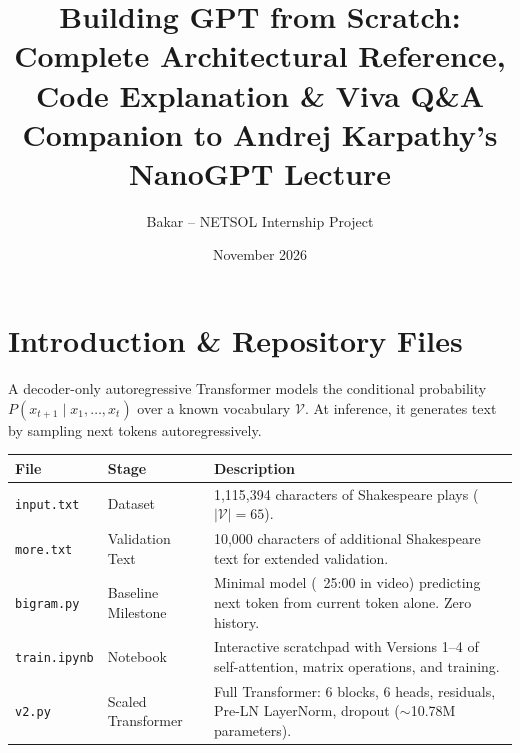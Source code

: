 \documentclass[10pt,a4paper]{article}
\title{\vspace{-1.2cm}\textbf{\Large Building GPT from Scratch: Complete Architectural Reference, Code Explanation \& Viva Q\&A}\\\normalsize Companion to Andrej Karpathy's NanoGPT Lecture\vspace{-0.6cm}}
\author{\small Bakar -- NETSOL Internship Project}
\date{\vspace{-0.3cm}\small November 2026\vspace{-0.5cm}}
\begin{document}
\maketitle

\section{Introduction \& Repository Files}
A decoder-only autoregressive Transformer models the conditional probability $P(x_{t+1} \mid x_1, \dots, x_t)$ over a known vocabulary $\mathcal{V}$. At inference, it generates text by sampling next tokens autoregressively.
\begin{center}
\small
\begin{tabular}{@{}llp{11.5cm}@{}}
\toprule
\textbf{File} & \textbf{Stage} & \textbf{Description} \\ \midrule
\texttt{input.txt} & Dataset & 1,115,394 characters of Shakespeare plays ($|\mathcal{V}| = 65$). \\
\texttt{more.txt} & Validation Text & 10,000 characters of additional Shakespeare text for extended validation. \\
\texttt{bigram.py} & Baseline Milestone & Minimal model (~25:00 in video) predicting next token from current token alone. Zero history. \\
\texttt{train.ipynb} & Notebook & Interactive scratchpad with Versions 1--4 of self-attention, matrix operations, and training. \\
\texttt{v2.py} & Scaled Transformer & Full Transformer: 6 blocks, 6 heads, residuals, Pre-LN LayerNorm, dropout ($\sim$10.78M parameters). \\
\bottomrule
\end{tabular}
\end{center}

\vspace{-0.2cm}
\end{document}
